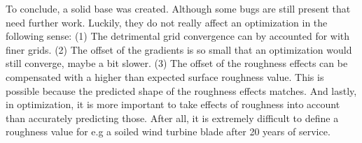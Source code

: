 To conclude, a solid base was created. Although some bugs are still present that
need further work. Luckily, they do not really affect an optimization in the
following sense: (1) The detrimental grid convergence can by accounted for with
finer grids. (2) The offset of the gradients is so small that an optimization
would still converge, maybe a bit slower. (3) The offset of the roughness
effects can be compensated with a higher than expected surface roughness value.
This is possible because the predicted shape of the roughness effects matches.
And lastly, in optimization, it is more important to take effects of roughness
into account than accurately predicting those. After all, it is extremely
difficult to define a roughness value for e.g a soiled wind turbine blade after
20 years of service.

